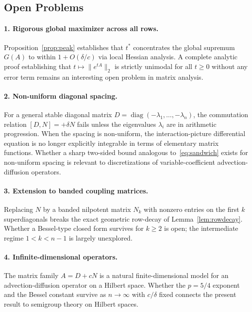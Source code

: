\documentclass[11pt,reqno]{article}
\theoremstyle{plain}
\theoremstyle{definition}
\theoremstyle{remark}
\numberwithin{equation}{section}
\begin{document}
\subsection{Open Problems}\label{subsec:open}

\paragraph{1. Rigorous global maximizer across all rows.} Proposition~\ref{prop:peak} establishes that $t^*$ concentrates the global supremum $G(A)$ to within $1 + O(\delta/c)$ via local Hessian analysis. A complete analytic proof establishing that $t \mapsto \|e^{tA}\|_2$ is strictly unimodal for all $t \ge 0$ without any error term remains an interesting open problem in matrix analysis.

\paragraph{2. Non-uniform diagonal spacing.} For a general stable diagonal matrix $D = \operatorname{diag}(-\lambda_1, \dots, -\lambda_n)$, the commutation relation $[D,N] = +\delta N$ fails unless the eigenvalues $\lambda_i$ are in arithmetic progression. When the spacing is non-uniform, the interaction-picture differential equation is no longer explicitly integrable in terms of elementary matrix functions. Whether a sharp two-sided bound analogous to~\eqref{eq:sandwich} exists for non-uniform spacing is relevant to discretizations of variable-coefficient advection-diffusion operators.

\paragraph{3. Extension to banded coupling matrices.} Replacing $N$ by a banded nilpotent matrix $N_k$ with nonzero entries on the first $k$ superdiagonals breaks the exact geometric row-decay of Lemma~\ref{lem:rowdecay}. Whether a Bessel-type closed form survives for $k \ge 2$ is open; the intermediate regime $1 < k < n-1$ is largely unexplored.

\paragraph{4. Infinite-dimensional operators.} The matrix family $A = D + cN$ is a natural finite-dimensional model for an advection-diffusion operator on a Hilbert space. Whether the $p = 5/4$ exponent and the Bessel constant survive as $n \to \infty$ with $c/\delta$ fixed connects the present result to semigroup theory on Hilbert spaces.
\end{document}
